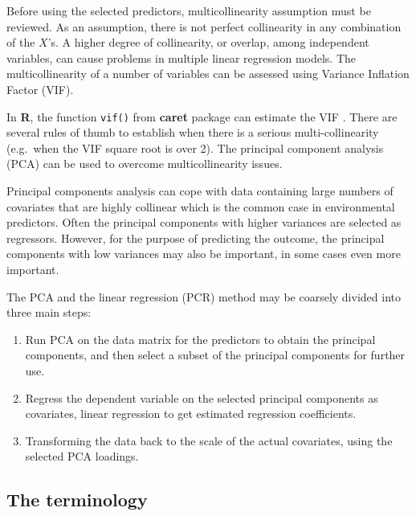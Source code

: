 \documentclass[10pt,b5paper,]{book}
\providecommand{\tightlist}{%
  \setlength{\itemsep}{0pt}\setlength{\parskip}{0pt}}
\theoremstyle{definition}
\theoremstyle{definition}
\theoremstyle{definition}
\theoremstyle{remark}
\begin{document}
Before using the selected predictors, multicollinearity assumption must
be reviewed. As an assumption, there is not perfect collinearity in any
combination of the \(X\)'s. A higher degree of collinearity, or overlap,
among independent variables, can cause problems in multiple linear
regression models. The multicollinearity of a number of variables can be
assessed using Variance Inflation Factor (VIF).

In \textbf{R}, the function \texttt{vif()} from \textbf{caret} package
can estimate the VIF . There are
several rules of thumb to establish when there is a serious
multi-collinearity (e.g.~when the VIF square root is over 2). The
principal component analysis (PCA) can be used to overcome
multicollinearity issues.

Principal components analysis can cope with data containing large
numbers of covariates that are highly collinear which is the common case
in environmental predictors. Often the principal components with higher
variances are selected as regressors. However, for the purpose of
predicting the outcome, the principal components with low variances may
also be important, in some cases even more important.

The PCA and the linear regression (PCR) method may be coarsely divided
into three main steps:

\begin{enumerate}
\def\labelenumi{\arabic{enumi}.}
\tightlist
\item
  Run PCA on the data matrix for the predictors to obtain the principal
  components, and then select a subset of the principal components for
  further use.
\item
  Regress the dependent variable on the selected principal components as
  covariates, linear regression to get estimated regression
  coefficients.
\item
  Transforming the data back to the scale of the actual covariates,
  using the selected PCA loadings.
\end{enumerate}

\hypertarget{the-terminology}{%
\subsection{The terminology}\label{the-terminology}}
\end{document}
